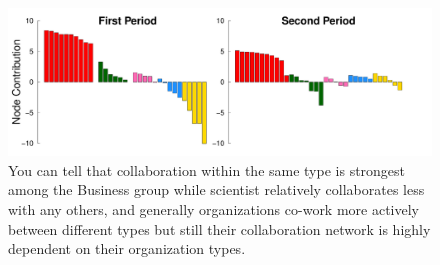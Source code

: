\documentclass[12pt]{article}
\begin{document}
\begin{figure}[h]
	\centering
	\includegraphics[width=\linewidth]{../../Figure/barplots_nolegend.pdf}	
	\caption{You can tell that collaboration within the same type is strongest among the Business group while scientist relatively collaborates less with any others, and generally organizations co-work more actively between different types but still their collaboration network is highly dependent on their organization types.}
	\label{fig:barplots}
\end{figure}
\end{document}

